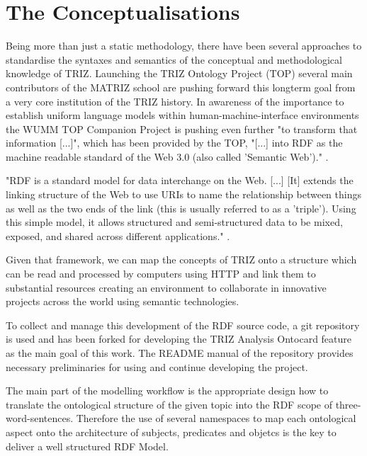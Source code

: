 \documentclass[a4paper,11pt]{article}
\begin{document}
\section{The Conceptualisations}
Being more than just a static methodology, there have been several approaches
to standardise the syntaxes and semantics of the conceptual and methodological
knowledge of TRIZ. Launching the TRIZ Ontology Project (TOP) several main
contributors of the MATRIZ school are pushing forward this longterm goal from
a very core institution of the TRIZ history.  In awareness of the importance
to establish uniform language models within human-machine-interface
environments the WUMM \cite{WUMM} TOP Companion Project \cite{WUMMTOP} is
pushing even further "to transform that information [...]", which has been
provided by the TOP, "[...] into RDF as the machine readable standard of the
Web 3.0 (also called 'Semantic Web')." \cite{WUMMTOP}.

"RDF is a standard model for data interchange on the Web. [...] [It] extends
the linking structure of the Web to use URIs to name the relationship between
things as well as the two ends of the link (this is usually referred to as a
'triple'). Using this simple model, it allows structured and semi-structured
data to be mixed, exposed, and shared across different applications."
\cite{RDF}.

Given that framework, we can map the concepts of TRIZ onto a structure which
can be read and processed by computers using HTTP and link them to substantial
resources creating an environment to collaborate in innovative projects across
the world using semantic technologies.

To collect and manage this development of the RDF source code, a git
repository \cite{RDFData} is used and has been forked for developing the TRIZ
Analysis Ontocard feature as the main goal of this work. The README manual of
the repository provides necessary preliminaries for using and continue
developing the project.

The main part of the modelling workflow is the appropriate design how to
translate the ontological structure of the given topic into the RDF scope of
three-word-sentences.  Therefore the use of several namespaces to map each
ontological aspect onto the architecture of subjects, predicates and objetcs
is the key to deliver a well structured RDF Model.
\end{document}
